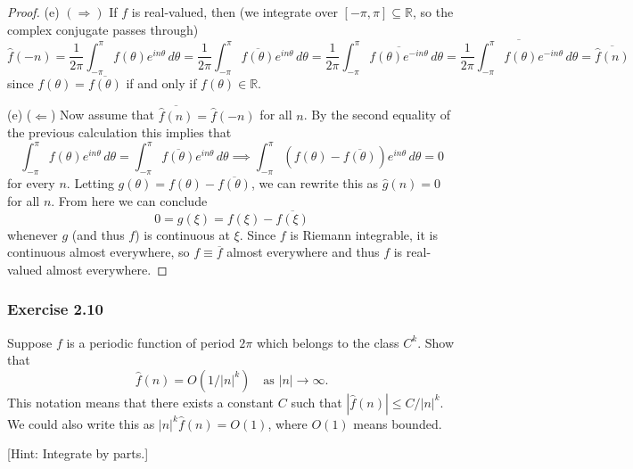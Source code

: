 \documentclass[letterpaper, 12pt]{article}
\newcommand{\R}{\mathbb{R}}
\begin{document}
\begin{proof}
  (e) $(\Longrightarrow)$ If $f$ is real-valued, then
  (we integrate over
  $[-\pi, \pi] \subseteq \R$, so
  the complex conjugate passes through)
  \[
    \hat{f}(-n)
    = \frac{1}{2\pi} \int_{-\pi}^{\pi} f(\theta) e^{in\theta}\, d\theta
    = \frac{1}{2\pi} \int_{-\pi}^{\pi} \overline{f(\theta)} e^{in\theta}\, d\theta
    = \frac{1}{2\pi} \int_{-\pi}^{\pi} \overline{f(\theta) e^{-in\theta}}\, d\theta
    = \overline{\frac{1}{2\pi} \int_{-\pi}^{\pi} f(\theta) e^{-in\theta}\, d\theta}
    = \overline{\hat{f}(n)}
  \]
  since $f(\theta) = \overline{f(\theta)}$ if and only if
  $f(\theta) \in \R$.

  (e) ($\Longleftarrow$) Now assume that
  $\overline{\hat{f}(n)} = \hat{f}(-n)$ for all $n$.
  By the second equality of the
  previous calculation this implies that
  \[
    \int_{-\pi}^{\pi} f(\theta) e^{in\theta}\, d\theta
    = \int_{-\pi}^{\pi} \overline{f(\theta)} e^{in\theta}\, d\theta
    \implies \int_{-\pi}^{\pi} (f(\theta) - \overline{f(\theta)}) e^{in\theta}\, d\theta = 0
  \]
  for every $n$. Letting $g(\theta) = f(\theta) - \overline{f(\theta)}$,
  we can rewrite this as $\hat{g}(n) = 0$ for all $n$.
  From here we can conclude
  \[0 = g(\xi) = f(\xi) - \overline{f(\xi)}\]
  whenever $g$ (and thus $f$) is continuous at $\xi$.
  Since $f$ is Riemann integrable, it is continuous
  almost everywhere, so $f \equiv \overline{f}$
  almost everywhere
  and thus $f$ is real-valued almost everywhere.
\end{proof}

\subsubsection{Exercise 2.10}
\begin{tcolorbox}
  Suppose $f$ is a periodic function of period $2\pi$
  which belongs to the class $C^k$. Show that
  \[\hat{f}(n) = O(1 / |n|^k) \quad \text{as } |n| \to \infty.\]
  This notation means that there exists a constant
  $C$ such that $|\hat{f}(n)| \le C / |n|^k$. We could
  also write this as $|n|^k \hat{f}(n) = O(1)$, where
  $O(1)$ means bounded.

  [Hint: Integrate by parts.]
\end{tcolorbox}
\end{document}
